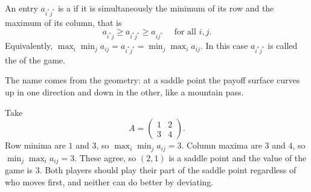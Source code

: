 \documentclass[a4paper]{scrartcl}
\begin{document}
\begin{definition}
    An entry $a_{i^*j^*}$ is a  if it is simultaneously the minimum of its row and the maximum of its column, that is
    $$
    a_{i^*j} \geq a_{i^*j^*} \geq a_{ij^*} \quad\text{ for all } i, j.
    $$
    Equivalently, $\max_i\min_j a_{ij} = a_{i^*j^*} = \min_j\max_i a_{ij}$. In this case $a_{i^*j^*}$ is called the  of the game.
\end{definition}

The name comes from the geometry: at a saddle point the payoff surface curves up in one direction and down in the other, like a mountain pass.

\begin{center}
\end{center}

\begin{example}
    Take
    $$
    A = \begin{pmatrix}1 & 2\\3&4\end{pmatrix}.
    $$
    Row minima are $1$ and $3$, so $\max_i\min_j a_{ij} = 3$. Column maxima are $3$ and $4$, so $\min_j\max_i a_{ij} = 3$. These agree, so $(2,1)$ is a saddle point and the value of the game is $3$. Both players should play their part of the saddle point regardless of who moves first, and neither can do better by deviating.
\end{example}
\end{document}
